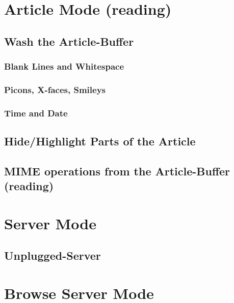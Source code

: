 \section*{Article Mode (reading)}
\ArticleModeGeneral
    \subsection*{Wash the Article-Buffer}
    \WashArticle
    \subsubsection*{Blank Lines and Whitespace}
    \BlankAndWhitespace
    \subsubsection*{Picons, X-faces, Smileys}
    \Picons
    \subsubsection*{Time and Date}
    \TimeAndDate
    \subsection*{Hide/Highlight Parts of the Article}
    \HideHighlightArticle
    \subsection*{MIME operations from the Article-Buffer (reading)}
    \MIMEArticleMode
%
%
\section*{Server Mode}
\ServerMode
    \subsection*{Unplugged-Server}
    \ServerUnplugged
%
%
\section*{Browse Server Mode}
\BrowseServer

\vspace*{\fill}
\Copyright




